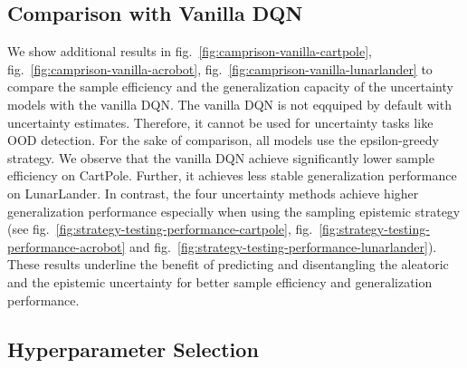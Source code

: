 



\subsection{Comparison with Vanilla DQN}

We show additional results in fig.~\ref{fig:camprison-vanilla-cartpole}, fig.~\ref{fig:camprison-vanilla-acrobot}, fig.~\ref{fig:camprison-vanilla-lunarlander} to compare the sample efficiency and the generalization capacity of the uncertainty models with the vanilla DQN. The vanilla DQN is not eqquiped by default with uncertainty estimates. Therefore, it cannot be used for uncertainty tasks like OOD detection. For the sake of comparison, all models use the epsilon-greedy strategy. We observe that the vanilla DQN achieve significantly lower sample efficiency on CartPole. Further, it achieves less stable generalization performance on LunarLander. In contrast, the four uncertainty methods achieve higher generalization performance especially when using the sampling epistemic strategy (see fig.~\ref{fig:strategy-testing-performance-cartpole}, fig.~\ref{fig:strategy-testing-performance-acrobot} and fig.~\ref{fig:strategy-testing-performance-lunarlander}). These results underline the benefit of predicting and disentangling the aleatoric and the epistemic uncertainty for better sample efficiency and generalization performance.





\subsection{Hyperparameter Selection}
\label{app:hyper-parameter-study}


